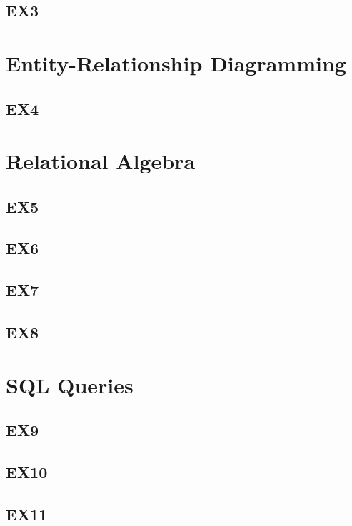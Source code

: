 \documentclass{article}
\begin{document}
	\subsection{EX3}
	
	\section{Entity-Relationship Diagramming}
	
	\subsection{EX4}
	
	\section{Relational Algebra}
	
	\subsection{EX5}
	
	\subsection{EX6}
	
	\subsection{EX7}
	
	\subsection{EX8}
	
	\section{SQL Queries}
	
	\subsection{EX9}
	
	\subsection{EX10}
	
	\subsection{EX11}
		
\end{document}
